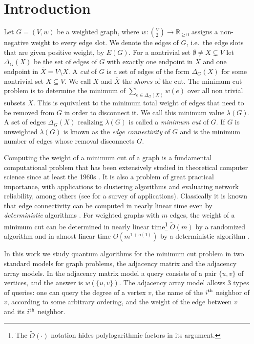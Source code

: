 \documentclass[10pt,a4paper]{article}
\newcommand{\R}{\mathbb{R}}
\newcommand{\ith}{i^{\scriptsize \mbox{{\rm th}}}}
\newcommand{\tO}{\tilde O}
\newcommand{\1}{\mathbf{1}}
\theoremstyle{definition}
\begin{document}
\section{Introduction}
Let $G = (V,w)$ be a weighted graph, where $w : \binom{V}{2} \rightarrow \R_{\ge 0}$ assigns a non-negative weight to every edge slot.  
We denote the edges of $G$, i.e.\ the edge slots that are given positive weight, by $E(G)$.  
For a nontrivial set $\emptyset \ne X \subsetneq V$ let 
$\Delta_G(X)$ be the set of edges of $G$ with exactly one endpoint in $X$ and 
one endpoint in $\overline{X} = V \setminus X$.  A \emph{cut} of $G$ is a set of 
edges of the form $\Delta_G(X)$ for some nontrivial set $X \subseteq V$.  We call $X$ and 
$\overline{X}$ the \emph{shores} of the cut.  The minimum cut problem is to determine the minimum of 
$\sum_{e \in \Delta_G(X)} w(e)$ over all non trivial subsets $X$.    This is equivalent to the minimum total weight of edges that need to be removed 
from $G$ in order to disconnect it.  We call this minimum value  $\lambda(G)$.  A set of edges $\Delta_G(X)$ realizing $\lambda(G)$ 
is called a \emph{minimum cut} of $G$.  If $G$ is unweighted $\lambda(G)$ is known as the \emph{edge connectivity} of $G$ and is the 
minimum number of edges whose removal disconnects $G$.

Computing the weight of a minimum cut of a graph is a 
fundamental computational problem that has been extensively studied in theoretical computer 
science since at least the 1960s \cite{GH61, FF62}.  It is also a problem of great practical importance, with applications 
to clustering algorithms \cite{Bot93} and evaluating network reliability, among others (see \cite{PQ82} for a survey of applications).  
Classically it is known that edge connectivity can be computed in nearly linear time even by 
\emph{deterministic} algorithms \cite{KT19,HRW20}.  For weighted graphs with $m$ edges, the weight of a minimum cut can be determined in 
nearly linear time\footnote{The $\tO(\cdot)$ notation hides polylogarithmic factors in its argument.} $\tO(m)$ by a randomized algorithm \cite{Karger00,MN20,GMW20} and in almost linear time $O(m^{1+o(1)})$ by a deterministic algorithm \cite{Li20}.

In this work we study quantum algorithms for the minimum cut problem
in two standard models for graph problems, the adjacency matrix and 
the adjacency array models.  In the adjacency matrix model a query consists of a pair $\{u,v\}$ of vertices, and the answer is $w(\{u,v\})$.  The adjacency array model allows $3$ types of queries: 
one can query the degree of a vertex $v$, the name of the $\ith$ neighbor of $v$, according to some arbitrary ordering, and the weight of the edge between 
$v$ and its $\ith$ neighbor.
\end{document}
